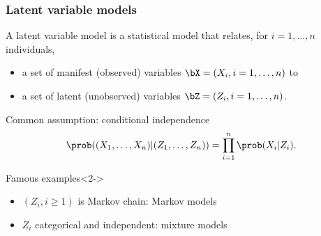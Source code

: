 \documentclass{beamer}\usepackage[]{graphicx}\usepackage[]{color}
\begin{document}
\begin{frame}
  \frametitle{Latent variable models}

  \begin{definition}
    A \alert{latent variable model} is a statistical model that relates, for $i=1,\dots,n$ individuals,
  \begin{itemize}
    \item a set of \alert{manifest} (observed) variables $\bX = (X_i, i=1,\dots,n)$ to
    \item a set of \alert{latent} (unobserved) variables $\bZ = (Z_i, i=1,\dots,n)$.
    \end{itemize}
  \end{definition}

  \begin{block}{Common assumption: conditional independence}
    \vspace{-.5cm}
    \begin{equation*}
      \prob((X_1, \dots, X_n)|(Z_1,\dots, Z_n))  = \prod_{i=1}^n \prob(X_i| Z_i).
    \end{equation*}
  \end{block}

  \vspace{-.25cm}

  \begin{block}{Famous examples}<2->
    \vspace{-.25cm}
    \begin{itemize}
      \item $(Z_i, i\geq 1)$ is Markov chain: \alert{Markov models}
      \item $Z_i$ categorical and independent: \alert{mixture models}
    \end{itemize}
  \end{block}

\end{frame}
\end{document}
